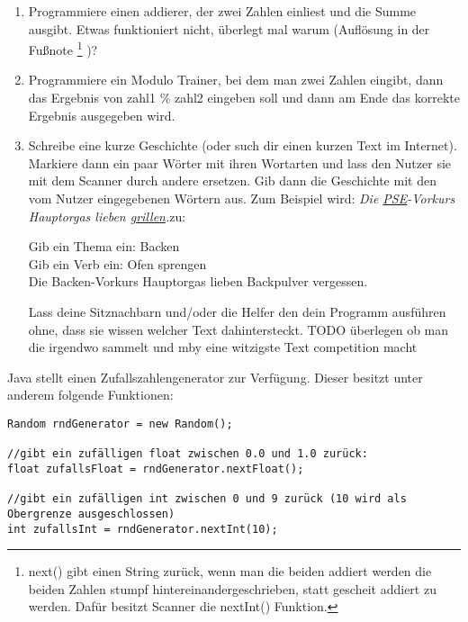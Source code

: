 \documentclass{../../sheet}
\begin{document}
\begin{enumerate}
    \item Programmiere einen addierer, der zwei Zahlen einliest und die Summe ausgibt. Etwas funktioniert nicht, überlegt mal warum (Auflösung in der Fußnote
          \footnote{
              next() gibt einen String zurück, wenn man die beiden addiert werden die beiden Zahlen stumpf hintereinandergeschrieben, statt gescheit addiert zu werden. Dafür besitzt Scanner die nextInt() Funktion.
          }
          )?
    \item Programmiere ein Modulo Trainer, bei dem man zwei Zahlen eingibt, dann das Ergebnis von zahl1 \% zahl2 eingeben soll und dann am Ende das korrekte Ergebnis ausgegeben wird.
    \item Schreibe eine kurze Geschichte (oder such dir einen kurzen Text im Internet). Markiere dann ein paar Wörter mit ihren Wortarten und lass den Nutzer sie mit dem Scanner durch andere ersetzen. Gib dann die Geschichte mit den vom Nutzer eingegebenen Wörtern aus. Zum Beispiel wird: \textquotesingle\textquotesingle\textit{Die \underline{PSE}-Vorkurs Hauptorgas lieben \underline{grillen}.}\textquotesingle\textquotesingle \space zu:
          \begin{ausgabe}
              Gib ein Thema ein: Backen\\
              Gib ein Verb ein: Ofen sprengen\\
              Die Backen-Vorkurs Hauptorgas lieben Backpulver vergessen.
          \end{ausgabe}
          Lass deine Sitznachbarn und/oder die Helfer den dein Programm ausführen ohne, dass sie wissen welcher Text dahintersteckt. TODO überlegen ob man die irgendwo sammelt und mby eine witzigste Text competition macht
\end{enumerate}

\newpage
{}
Java stellt einen Zufallszahlengenerator zur Verfügung. Dieser besitzt unter anderem folgende Funktionen:

\begin{verbatim}
Random rndGenerator = new Random();

//gibt ein zufälligen float zwischen 0.0 und 1.0 zurück:
float zufallsFloat = rndGenerator.nextFloat();

//gibt ein zufälligen int zwischen 0 und 9 zurück (10 wird als Obergrenze ausgeschlossen)
int zufallsInt = rndGenerator.nextInt(10);
\end{verbatim}
\end{document}
